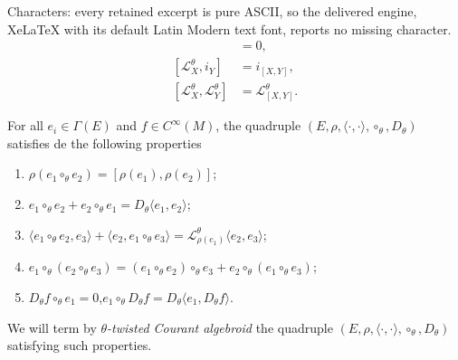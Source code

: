 \documentclass[10pt,a4paper]{amsart}
\begin{document}
Characters: every retained excerpt is pure ASCII, so the delivered engine, XeLaTeX with its default Latin Modern text font, reports no missing character.
\begin{align}
	[\mathcal{L}^{\theta}_{X},d_{\theta}] &= 0, \label{cartan1}\\
	[\mathcal{L}^{\theta}_{X}, i_{Y}] &= i_{[X,Y]}, \label{cartan2}\\
	[\mathcal{L}^{\theta}_{X},\mathcal{L}^{\theta}_{Y}] &= \mathcal{L}^{\theta}_{[X,Y]}. \label{cartan3}
\end{align}

\begin{proposition}\label{prop:Courant-theta}
 For all $e_i\in\Gamma(E)$ and $f\in C^\infty(M)$, the quadruple $(E,\rho,\langle\cdot,\cdot\rangle,\circ_\theta,D_\theta)$ satisfies de the following properties
\begin{enumerate}
\item $\rho(e_1\circ_\theta e_2) = [\rho(e_1),\rho(e_2)]$;
\item $e_1\circ_\theta e_2 + e_2\circ_\theta e_1 = D_\theta\langle e_1,e_2\rangle$;
\item $\langle e_1\circ_\theta e_2, e_3\rangle + \langle e_2, e_1\circ_\theta e_3\rangle = \mathcal{L}^\theta_{\rho(e_1)} \langle e_2,e_3\rangle$;
\item $e_1\circ_\theta (e_2\circ_\theta e_3) = (e_1\circ_\theta e_2)\circ_\theta e_3 + e_2\circ_\theta (e_1\circ_\theta e_3)$;
\item $D_\theta f \circ_\theta e_1 = 0$,\quad $e_1 \circ_\theta D_\theta f = D_\theta\langle e_1, D_\theta f\rangle$.
\end{enumerate}
We will term by \emph{$\theta$-twisted Courant algebroid } the quadruple $(E,\rho,\langle\cdot,\cdot\rangle,\circ_\theta,D_\theta)$ satisfying such properties.
\end{proposition}
\end{document}
